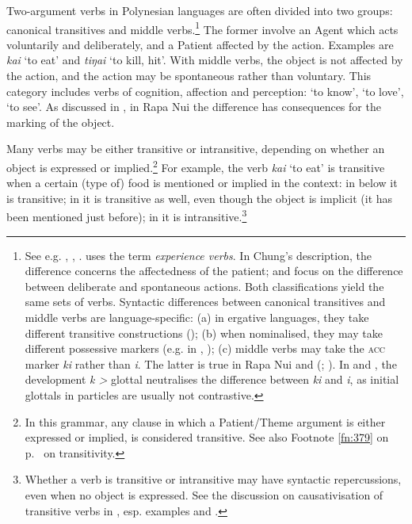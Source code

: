 Two-argument verbs in Polynesian languages are often divided into two groups: ca\-nonical transitives and middle verbs.\footnote{\label{fn:114}See e.g. \citet{Chung1978}, \citet{Hooper1984Neuter}, \citet{Harlow2007Maori}. \citet{Bauer1983} uses the term \textit{experience verbs}. In Chung’s description, the difference concerns the affectedness of the patient; \citet{Pawley1973} and \citet{ElbertPukui1979} focus on the difference between deliberate and spontaneous actions. Both classifications yield the same sets of verbs. Syntactic differences between canonical transitives and middle verbs are language-specific: (a) in ergative languages, they take different transitive constructions (); (b) when nominalised, they may take different possessive markers (e.g. in , \citealt[48]{ElbertPukui1979}); (c) middle verbs may take the \textsc{acc} marker \textit{ki} rather than \textit{i}. The latter is true in Rapa Nui and  (\citealt{Bauer1983}; \citealt[267]{Bauer1997}). In  and , the development \textit{k {\textgreater}} glottal neutralises the difference between \textit{ki} and \textit{i}, as initial glottals in particles are usually not contrastive.} The former involve an Agent which acts voluntarily and deliberately, and a Patient affected by the action. Examples are \textit{kai} ‘to eat’ and \textit{\mbox{tiŋa{\ꞌ}i}} ‘to kill, hit’. With middle verbs, the object is not affected by the action, and the action may be spontaneous rather than voluntary. This category includes verbs of cognition, affection and perception: ‘to know’, ‘to love’, ‘to see’. As discussed in , in Rapa Nui the difference has consequences for the marking of the object.

Many verbs may be either transitive or intransitive, depending on whether an object is expressed or implied.\footnote{\label{fn:115}In this grammar, any clause in which a Patient/Theme argument is either expressed or implied, is considered transitive. See also Footnote \ref{fn:379} on p.~\pageref{fn:379} on transitivity.} For example, the verb \textit{kai} ‘to eat’ is transitive when a certain (type of) food is mentioned or implied in the context: in  below it is transitive; in  it is transitive as well, even though the object is implicit (it has been mentioned just before); in  it is intransitive.\footnote{\label{fn:116}Whether a verb is transitive or intransitive may have syntactic repercussions, even when no object is expressed. See the discussion on causativisation of transitive verbs in , esp. examples  and .} 

